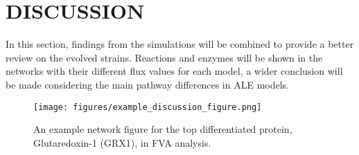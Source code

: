 \chapter{DISCUSSION}
In this section, findings from the simulations will be combined to provide a better review on the evolved strains. Reactions and enzymes will be shown in the networks with their different flux values for each model, a wider conclusion will be made considering the main pathway differences in ALE models.

\begin{figure}[H]
\texttt{[image: figures/example\_discussion\_figure.png]}
\caption[An example network figure for the top differentiated protein Glutaredoxin-1 (GRX1) in FVA analysis.]{An example network figure for the top differentiated protein, Glutaredoxin-1 (GRX1), in FVA analysis.}
\label{fig:example_discussion_figure}
\end{figure}
